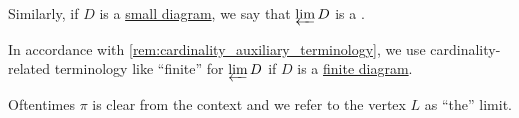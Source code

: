 \begin{definition}
\begin{thmenum}
     Similarly, if \( D \) is a \hyperref[def:categorical_diagram/small]{small diagram}, we say that \( \varprojlim D \) is a .

     In accordance with \cref{rem:cardinality_auxiliary_terminology}, we use cardinality-related terminology like \enquote{finite} for \( \varprojlim D \) if \( D \) is a \hyperref[def:categorical_diagram/cardinality]{finite diagram}.
  \end{thmenum}
\end{definition}
\begin{comments}
  \item Oftentimes \( \pi \) is clear from the context and we refer to the vertex \( L \) as \enquote{the} limit.
\end{comments}

